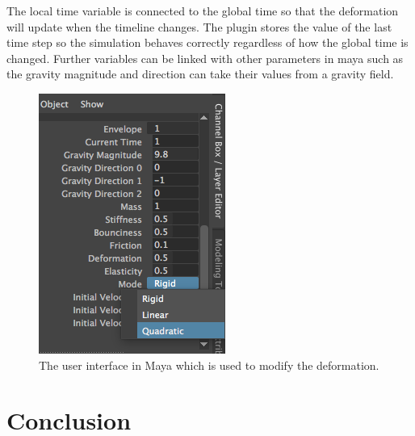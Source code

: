 The local time variable is connected to the global time so that the deformation will update when the timeline changes. The plugin stores the value of the last time step so the simulation behaves correctly regardless of how the global time is changed. Further variables can be linked with other parameters in maya such as the gravity magnitude and direction can take their values from a gravity field.

 \begin{figure}[t]
    \includegraphics[width=\linewidth]{img/gui.png}
    \caption{The user interface in Maya which is used to modify the deformation.}
    \label{fig:gui}
    \end{figure}

\section{Conclusion}

